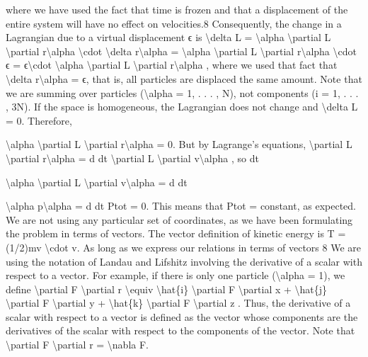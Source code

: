 \begin{exercise}
where we have used the fact that time is frozen and that a displacement of the
entire system will have no effect on velocities.8
Consequently, the change in a Lagrangian due to a virtual displacement ϵ is
\textbackslash{}delta L =
\textbackslash{}alpha
\textbackslash{}partial L
\textbackslash{}partial r\textbackslash{}alpha
\textbackslash{}cdot  \textbackslash{}delta r\textbackslash{}alpha  =
\textbackslash{}alpha
\textbackslash{}partial L
\textbackslash{}partial r\textbackslash{}alpha
\textbackslash{}cdot  ϵ = ϵ\textbackslash{}cdot
\textbackslash{}alpha
\textbackslash{}partial L
\textbackslash{}partial r\textbackslash{}alpha
,
where we used that fact that \textbackslash{}delta r\textbackslash{}alpha  = ϵ, that is, all particles are displaced the
same amount. Note that we are summing over particles (\textbackslash{}alpha  = 1, . . . , N), not
components (i = 1, . . . , 3N).
If the space is homogeneous, the Lagrangian does not change and \textbackslash{}delta L = 0.
Therefore,

\textbackslash{}alpha
\textbackslash{}partial L
\textbackslash{}partial r\textbackslash{}alpha
= 0.
But by Lagrange's equations,
\textbackslash{}partial L
\textbackslash{}partial r\textbackslash{}alpha
= d
dt
\textbackslash{}partial L
\textbackslash{}partial v\textbackslash{}alpha
,
so
dt

\textbackslash{}alpha
\textbackslash{}partial L
\textbackslash{}partial v\textbackslash{}alpha
= d
dt

\textbackslash{}alpha
p\textbackslash{}alpha  = d
dt Ptot = 0.
This means that
Ptot = constant,
as expected.
We are not using any particular set of coordinates, as we have been formulating the problem in terms of vectors. The vector definition of kinetic energy
is T = (1/2)mv \textbackslash{}cdot  v. As long as we express our relations in terms of vectors
8 We are using the notation of Landau and Lifshitz involving the derivative of a scalar with
respect to a vector. For example, if there is only one particle (\textbackslash{}alpha  = 1), we define
\textbackslash{}partial F
\textbackslash{}partial r \textbackslash{}equiv \textbackslash{}hat\{i\} \textbackslash{}partial F
\textbackslash{}partial x + \textbackslash{}hat\{j\} \textbackslash{}partial F
\textbackslash{}partial y + \textbackslash{}hat\{k\} \textbackslash{}partial F
\textbackslash{}partial z .
Thus, the derivative of a scalar with respect to a vector is defined as the vector whose
components are the derivatives of the scalar with respect to the components of the vector.
Note that
\textbackslash{}partial F
\textbackslash{}partial r = \textbackslash{}nabla F.


\end{exercise}
